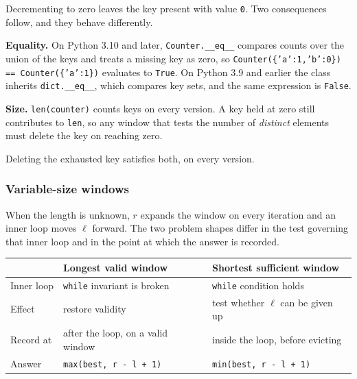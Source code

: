 \begin{keybox}
Decrementing to zero leaves the key present with value \texttt{0}. Two
consequences follow, and they behave differently.

\medskip

\textbf{Equality.} On Python 3.10 and later, \texttt{Counter.\_\_eq\_\_}
compares counts over the union of the keys and treats a missing key as zero, so
\texttt{Counter(\{'a':1,'b':0\}) == Counter(\{'a':1\})} evaluates to
\texttt{True}. On Python 3.9 and earlier the class inherits
\texttt{dict.\_\_eq\_\_}, which compares key sets, and the same expression is
\texttt{False}.

\medskip

\textbf{Size.} \texttt{len(counter)} counts keys on every version. A key held at
zero still contributes to \texttt{len}, so any window that tests the number of
\emph{distinct} elements must delete the key on reaching zero.

\medskip

Deleting the exhausted key satisfies both, on every version.
\end{keybox}

\subsubsection*{Variable-size windows}

When the length is unknown, $r$ expands the window on every iteration and an
inner loop moves $\ell$ forward. The two problem shapes differ in the test
governing that inner loop and in the point at which the answer is recorded.

\begin{center}
\begin{tabular}{lll}
\toprule
& \textbf{Longest valid window} & \textbf{Shortest sufficient window} \\
\midrule
Inner loop & \texttt{while} invariant is broken & \texttt{while} condition holds \\
Effect     & restore validity & test whether $\ell$ can be given up \\
Record at  & after the loop, on a valid window & inside the loop, before evicting \\
Answer     & \texttt{max(best, r - l + 1)}      & \texttt{min(best, r - l + 1)} \\
\bottomrule
\end{tabular}
\end{center}

